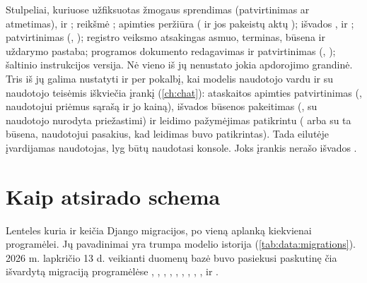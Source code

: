 \begin{humanbox}{Stulpeliai, kuriuose užfiksuotas žmogaus sprendimas}
 (patvirtinimas ar atmetimas),  ir ;
 reikšmė ; apimties peržiūra
( ir jos pakeistų aktų ); išvados
,  ir ; patvirtinimas
(, ); registro veiksmo atsakingas asmuo,
terminas, būsena ir uždarymo pastaba; programos dokumento redagavimas ir patvirtinimas
(, ); šaltinio  instrukcijos versija. Nė vieno
iš jų nenustato jokia apdorojimo grandinė. Tris iš jų galima nustatyti ir per pokalbį, kai modelis
naudotojo vardu ir su naudotojo teisėmis iškviečia įrankį (\cref{ch:chat}): ataskaitos
apimties patvirtinimas (, naudotojui priėmus sąrašą ir jo kainą),
išvados būsenos pakeitimas (, su naudotojo nurodyta priežastimi) ir
leidimo pažymėjimas patikrintu ( arba  su ta
būsena, naudotojui pasakius, kad leidimas buvo patikrintas). Tada eilutėje įvardijamas naudotojas, lyg būtų naudotasi konsole. Joks įrankis
nerašo išvados .
\end{humanbox}

\section{Kaip atsirado schema}\label{sec:data:history}

Lenteles kuria ir keičia Django migracijos, po vieną aplanką kiekvienai programėlei. Jų
pavadinimai yra trumpa modelio istorija (\cref{tab:data:migrations}). 2026 m. lapkričio 13 d.
veikianti duomenų bazė buvo pasiekusi paskutinę čia išvardytą migraciją programėlėse
, , , , ,
, , , ,  ir .


